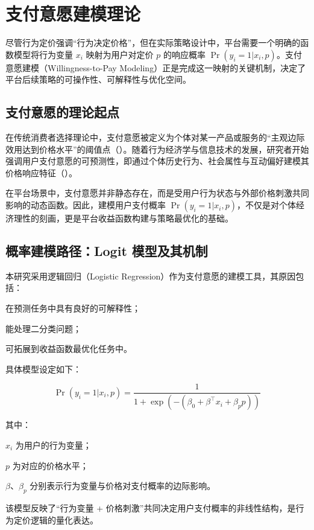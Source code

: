 \section{支付意愿建模理论}
\label{sec:支付意愿建模理论}

尽管行为定价强调“行为决定价格”，但在实际策略设计中，平台需要一个明确的函数模型将行为变量 $x_i$ 映射为用户对定价 $p$ 的响应概率 $\Pr(y_i=1|x_i,p)$。支付意愿建模（Willingness-to-Pay Modeling）正是完成这一映射的关键机制，决定了平台后续策略的可操作性、可解释性与优化空间。

\subsection{支付意愿的理论起点}

在传统消费者选择理论中，支付意愿被定义为个体对某一产品或服务的“主观边际效用达到价格水平”的阈值点（\cite{lancaster_1966}）。随着行为经济学与信息技术的发展，研究者开始强调用户支付意愿的可预测性，即通过个体历史行为、社会属性与互动偏好建模其价格响应特征（\cite{louviere_et_al_2000}）。

在平台场景中，支付意愿并非静态存在，而是受用户行为状态与外部价格刺激共同影响的动态函数。因此，建模用户支付概率 $\Pr(y_i = 1|x_i, p)$，不仅是对个体经济理性的刻画，更是平台收益函数构建与策略最优化的基础。

\subsection{概率建模路径：Logit 模型及其机制}

本研究采用逻辑回归（Logistic Regression）作为支付意愿的建模工具，其原因包括：

在预测任务中具有良好的可解释性；

能处理二分类问题；

可拓展到收益函数最优化任务中。

具体模型设定如下：

\begin{equation}
\Pr(y_i = 1 | x_i, p) = \frac{1}{1 + \exp(-(\beta_0 + \beta^\top x_i + \beta_p p))}
\label{eq:logit}
\end{equation}

其中：

$x_i$ 为用户的行为变量；

$p$ 为对应的价格水平；

$\beta$、$\beta_p$ 分别表示行为变量与价格对支付概率的边际影响。

该模型反映了“行为变量 + 价格刺激”共同决定用户支付概率的非线性结构，是行为定价逻辑的量化表达。

